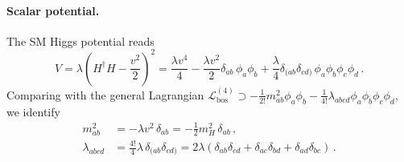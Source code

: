 \paragraph{Scalar potential.}
The SM Higgs potential reads
\begin{equation}\label{eq:Higgs_potential}
    V = \lambda \left(H^\dagger H - \frac{v^2}{2}\right)^2 =\frac{\lambda v^4}{4} -\frac{\lambda v^2}{2}\delta_{ab}\,\phi_a \phi_b + \frac{\lambda}{4}\delta_{(ab}\delta_{cd)}\,\phi_a\phi_b\phi_c\phi_d\,.
\end{equation}
Comparing with the general Lagrangian $\mathcal{L}^{(4)}_{\text{bos}} \supset -\frac{1}{2!}m^2_{ab}\phi_a\phi_b - \frac{1}{4!}\lambda_{abcd}\phi_a\phi_b\phi_c\phi_d$, we identify
\begin{align}
    m^2_{ab} &= -\lambda v^2\,\delta_{ab} = -\frac{1}{2}m_H^2\,\delta_{ab}\,,
    \label{eq:mass_SM}
    \\
    \lambda_{abcd} &=\frac{4!}{4}\lambda\,\delta_{(ab}\delta_{cd)} =2\lambda\left(\delta_{ab}\delta_{cd}+\delta_{ac}\delta_{bd}+\delta_{ad}\delta_{bc}\right)\,.%
    \label{eq:quartic_SM}
\end{align}

